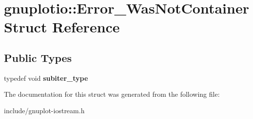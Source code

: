 \hypertarget{structgnuplotio_1_1Error__WasNotContainer}{}\section{gnuplotio\+:\+:Error\+\_\+\+Was\+Not\+Container Struct Reference}
\label{structgnuplotio_1_1Error__WasNotContainer}
\subsection*{Public Types}
\begin{DoxyCompactItemize}
\item 
\mbox{\label{structgnuplotio_1_1Error__WasNotContainer_aeac5de90c903be765130fc14f85dfb00}} 
typedef void {\bfseries subiter\+\_\+type}
\end{DoxyCompactItemize}


The documentation for this struct was generated from the following file\+:\begin{DoxyCompactItemize}
\item 
include/gnuplot-\/iostream.\+h\end{DoxyCompactItemize}

